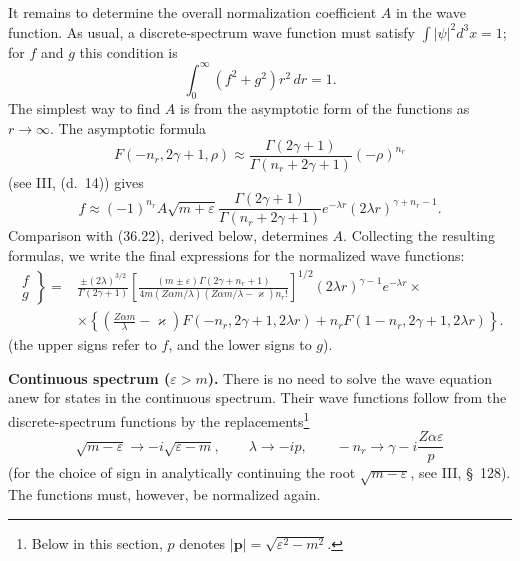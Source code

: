 It remains to determine the overall normalization coefficient $A$ in the wave function. As usual, a discrete-spectrum wave function must satisfy $\int|\psi|^2d^3x=1$; for $f$ and $g$ this condition is
\[
\int_0^\infty(f^2+g^2)r^2\,dr=1.
\]
The simplest way to find $A$ is from the asymptotic form of the functions as $r\to\infty$. The asymptotic formula
\[
F(-n_r,2\gamma+1,\rho)
\approx\frac{\Gamma(2\gamma+1)}{\Gamma(n_r+2\gamma+1)}(-\rho)^{n_r}
\]
(see III, (d.~14)) gives
\[
f\approx(-1)^{n_r}A\sqrt{m+\varepsilon}
\frac{\Gamma(2\gamma+1)}{\Gamma(n_r+2\gamma+1)}
e^{-\lambda r}(2\lambda r)^{\gamma+n_r-1}.
\]
Comparison with (36.22), derived below, determines $A$. Collecting the resulting formulas, we write the final expressions for the normalized wave functions:
\begin{equation}
\begin{aligned}
\left.\begin{matrix}f\\g\end{matrix}\right\}
={}&\frac{\pm(2\lambda)^{3/2}}{\Gamma(2\gamma+1)}
\left[\frac{(m\pm\varepsilon)\Gamma(2\gamma+n_r+1)}
{4m(Z\alpha m/\lambda)(Z\alpha m/\lambda-\varkappa)n_r!}\right]^{1/2}
(2\lambda r)^{\gamma-1}e^{-\lambda r}\times{}\\
&\times\left\{\left(\frac{Z\alpha m}{\lambda}-\varkappa\right)
F(-n_r,2\gamma+1,2\lambda r)
+n_rF(1-n_r,2\gamma+1,2\lambda r)\right\}.
\end{aligned}
\tag{36.11}
\end{equation}
(the upper signs refer to $f$, and the lower signs to $g$).

\textbf{Continuous spectrum ($\varepsilon>m$).} There is no need to solve the wave equation anew for states in the continuous spectrum. Their wave functions follow from the discrete-spectrum functions by the replacements\footnote{Below in this section, $p$ denotes $|\mathbf p|=\sqrt{\varepsilon^2-m^2}$.}
\begin{equation}
\sqrt{m-\varepsilon}\to-i\sqrt{\varepsilon-m},
\qquad
\lambda\to-ip,
\qquad
-n_r\to\gamma-i\frac{Z\alpha\varepsilon}{p}
\tag{36.12}
\end{equation}
(for the choice of sign in analytically continuing the root $\sqrt{m-\varepsilon}$, see III, \S~128). The functions must, however, be normalized again.

